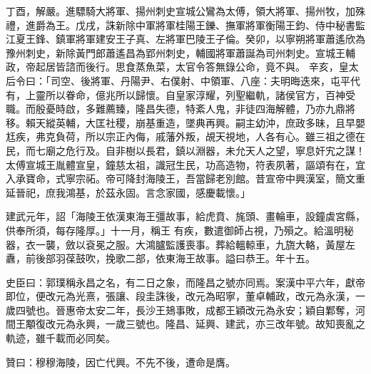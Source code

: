 \begin{pinyinscope}
 丁酉，解嚴。進驃騎大將軍、揚州刺史宣城公鸞為太傅，領大將軍、揚州牧，加殊禮，進爵為王。戊戌，誅新除中軍將軍桂陽王鑠、撫軍將軍衡陽王鈞、侍中秘書監江夏王鋒、鎮軍將軍建安王子真、左將軍巴陵王子倫。癸卯，以寧朔將軍蕭遙欣為豫州刺史，新除黃門郎蕭遙昌為郢州刺史，輔國將軍蕭誕為司州刺史。宣城王輔政，帝起居皆諮而後行。思食蒸魚菜，太官令答無錄公命，竟不與。
 辛亥，皇太后令曰：「司空、後將軍、丹陽尹、右僕射、中領軍、八座：夫明晦迭來，屯平代有，上靈所以眷命，億兆所以歸懷。自皇家淳耀，列聖繼軌，諸侯官方，百神受職。而殷憂時啟，多難薦臻，隆昌失德，特紊人鬼，非徒四海解體，乃亦九鼎將移。賴天縱英輔，大匡社稷，崩基重造，墜典再興。嗣主幼沖，庶政多昧，且早嬰尪疾，弗克負荷，所以宗正內侮，戚藩外叛，覘天視地，人各有心。雖三祖之德在民，而七廟之危行及。自非樹以長君，鎮以淵器，未允天人之望，寧息奸宄之謀！太傅宣城王胤體宣皇，鐘慈太祖，識冠生民，功高造物，符表夙著，謳頌有在，宜入承寶命，式寧宗祏。帝可降封海陵王，吾當歸老別館。昔宣帝中興漢室，簡文重延晉祀，庶我鴻基，於茲永固。言念家國，感慶載懷。」



 建武元年，詔「海陵王依漢東海王彊故事，給虎賁、旄頭、畫輪車，設鐘虡宮縣，供奉所須，每存隆厚。」十一月，稱王
 有疾，數遣御師占視，乃殞之。給溫明秘器，衣一襲，斂以袞冕之服。大鴻臚監護喪事。葬給轀輬車，九旒大輅，黃屋左纛，前後部羽葆鼓吹，挽歌二部，依東海王故事。謚曰恭王。年十五。



 史臣曰：郭璞稱永昌之名，有二日之象，而隆昌之號亦同焉。案漢中平六年，獻帝即位，便改元為光熹，張讓、段圭誅後，改元為昭寧，董卓輔政，改元為永漢，一歲四號也。晉惠帝太安二年，長沙王鳷事敗，成都王穎改元為永安；穎自鄴奪，河間王顒復改元為永興，一歲三號也。隆昌、延興、建武，亦三改年號。故知喪亂之軌迹，雖千載而必同矣。



 贊曰：穆穆海陵，因亡代興。不先不後，遭命是膺。



\end{pinyinscope}